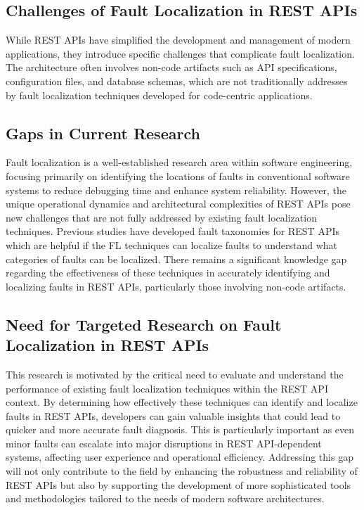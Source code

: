 \documentclass[conference]{IEEEtran}
\begin{document}
\subsection{Challenges of Fault Localization in REST APIs}
While REST APIs have simplified the development and management of modern applications, they introduce specific challenges that complicate fault localization.
The architecture often involves non-code artifacts such as API specifications, configuration files, and database schemas, which are not traditionally addresses by fault localization techniques developed for code-centric applications. 


\subsection{Gaps in Current Research}
Fault localization is a well-established research area within software engineering, focusing primarily on identifying the locations of faults in conventional software systems to reduce debugging time and enhance system reliability.
 However, the unique operational dynamics and architectural complexities of REST APIs pose new challenges that are not fully addressed by existing fault localization techniques.
Previous studies have developed fault taxonomies for REST APIs which are helpful if the FL techniques can localize faults to understand what categories of faults can be localized.
There remains a significant knowledge gap regarding the effectiveness of these techniques in accurately identifying and localizing faults in REST APIs, particularly those involving non-code artifacts.


\subsection{Need for Targeted Research on Fault Localization in REST APIs}
This research is motivated by the critical need to evaluate and understand the performance of existing fault localization techniques within the REST API context. 
By determining how effectively these techniques can identify and localize faults in REST APIs, developers can gain valuable insights that could lead to quicker and more accurate fault diagnosis. This is particularly important as even minor faults can escalate into major disruptions in REST API-dependent systems, affecting user experience and operational efficiency. Addressing this gap will not only contribute to the field by enhancing the robustness and reliability of REST APIs but also by supporting the development of more sophisticated tools and methodologies tailored to the needs of modern software architectures.
\end{document}
